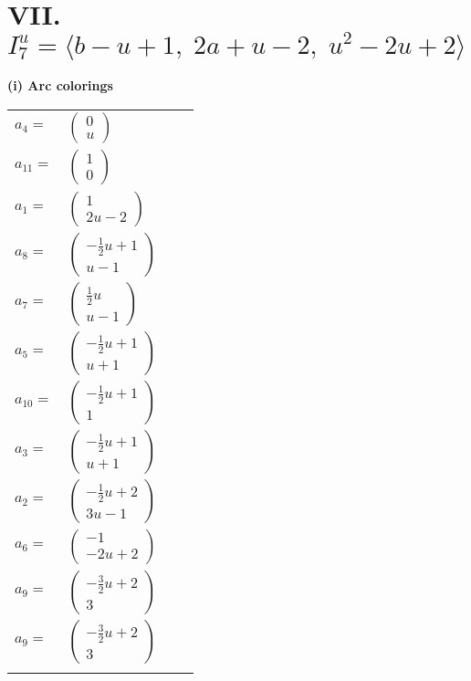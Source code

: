 \documentclass[1p]{elsarticle_modified}
\theoremstyle{definition}
\begin{document}
\centering \section*{VII. $I^u_{7}= \langle b- u+1,\;2 a+u-2,\;u^2-2 u+2 \rangle$}
\flushleft \textbf{(i) Arc colorings}\\
\begin{tabular}{m{7pt} m{180pt} m{7pt} m{180pt} }
\flushright $a_{4}=$&$\begin{pmatrix}0\\u\end{pmatrix}$ \\
\flushright $a_{11}=$&$\begin{pmatrix}1\\0\end{pmatrix}$ \\
\flushright $a_{1}=$&$\begin{pmatrix}1\\2 u-2\end{pmatrix}$ \\
\flushright $a_{8}=$&$\begin{pmatrix}-\frac{1}{2} u+1\\u-1\end{pmatrix}$ \\
\flushright $a_{7}=$&$\begin{pmatrix}\frac{1}{2} u\\u-1\end{pmatrix}$ \\
\flushright $a_{5}=$&$\begin{pmatrix}-\frac{1}{2} u+1\\u+1\end{pmatrix}$ \\
\flushright $a_{10}=$&$\begin{pmatrix}-\frac{1}{2} u+1\\1\end{pmatrix}$ \\
\flushright $a_{3}=$&$\begin{pmatrix}-\frac{1}{2} u+1\\u+1\end{pmatrix}$ \\
\flushright $a_{2}=$&$\begin{pmatrix}-\frac{1}{2} u+2\\3 u-1\end{pmatrix}$ \\
\flushright $a_{6}=$&$\begin{pmatrix}-1\\-2 u+2\end{pmatrix}$ \\
\flushright $a_{9}=$&$\begin{pmatrix}-\frac{3}{2} u+2\\3\end{pmatrix}$\\ \flushright $a_{9}=$&$\begin{pmatrix}-\frac{3}{2} u+2\\3\end{pmatrix}$\\&\end{tabular}
\end{document}

